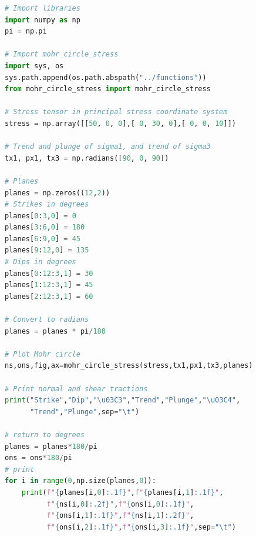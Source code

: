 \documentclass[a4paper , 12pt]{book}
\begin{document}
\begin{center}
\begin{lstlisting}[language=Python, frame=single]
# Import libraries
import numpy as np
pi = np.pi

# Import mohr_circle_stress
import sys, os
sys.path.append(os.path.abspath("../functions"))
from mohr_circle_stress import mohr_circle_stress

# Stress tensor in principal stress coordinate system
stress = np.array([[50, 0, 0],[ 0, 30, 0],[ 0, 0, 10]])

# Trend and plunge of sigma1, and trend of sigma3
tx1, px1, tx3 = np.radians([90, 0, 90])

# Planes
planes = np.zeros((12,2))
# Strikes in degrees
planes[0:3,0] = 0
planes[3:6,0] = 180
planes[6:9,0] = 45
planes[9:12,0] = 135
# Dips in degrees
planes[0:12:3,1] = 30
planes[1:12:3,1] = 45
planes[2:12:3,1] = 60

# Convert to radians
planes = planes * pi/180
 
# Plot Mohr circle
ns,ons,fig,ax=mohr_circle_stress(stress,tx1,px1,tx3,planes)

# Print normal and shear tractions
print("Strike","Dip","\u03C3","Trend","Plunge","\u03C4",
      "Trend","Plunge",sep="\t")

# return to degrees
planes = planes*180/pi
ons = ons*180/pi
# print
for i in range(0,np.size(planes,0)):
    print(f"{planes[i,0]:.1f}",f"{planes[i,1]:.1f}",
          f"{ns[i,0]:.2f}",f"{ons[i,0]:.1f}",
          f"{ons[i,1]:.1f}",f"{ns[i,1]:.2f}",
          f"{ons[i,2]:.1f}",f"{ons[i,3]:.1f}",sep="\t")
\end{lstlisting}
\end{center}
\end{document}
